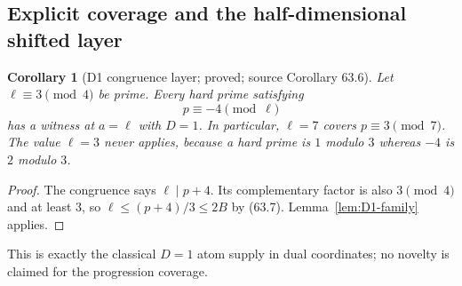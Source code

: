 \documentclass[10pt,reqno]{amsart}
\newtheorem{corollary}[theorem]{Corollary}
\theoremstyle{definition}
\newcommand{\1}{\mathbf 1}
\begin{document}
\subsection{Explicit coverage and the half-dimensional shifted layer}
\begin{corollary}[D1 congruence layer; proved; source Corollary 63.6]
\label{cor:D1-layer}
Let $\ell\equiv3\pmod4$ be prime.  Every hard prime satisfying
\begin{equation}\tag{63.17}
                              p\equiv-4\pmod\ell
\end{equation}
has a witness at $a=\ell$ with $D=1$.  In particular, $\ell=7$ covers
$p\equiv3\pmod7$.  The value $\ell=3$ never applies, because a hard prime
is $1$ modulo $3$ whereas $-4$ is $2$ modulo $3$.
\end{corollary}
\begin{proof}
The congruence says $\ell\mid p+4$.  Its complementary factor is also
$3\pmod4$ and at least $3$, so
$\ell\leq(p+4)/3\leq2B$ by (63.7).  Lemma~\ref{lem:D1-family} applies.
\end{proof}
This is exactly the classical $D=1$ atom supply in dual coordinates; no
novelty is claimed for the progression coverage.
\end{document}
